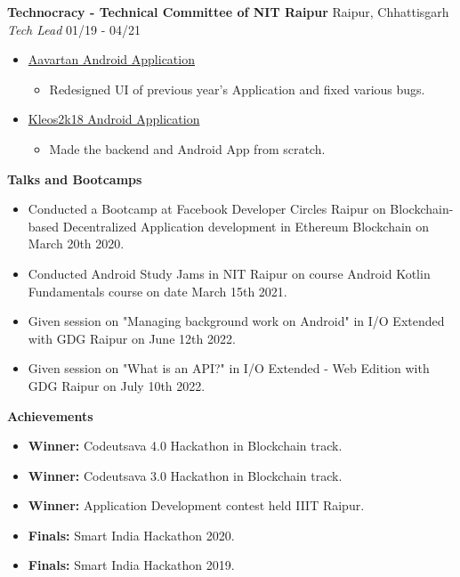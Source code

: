 \documentclass{article}
\begin{document}
\noindent \normalsize \textbf{Technocracy - Technical Committee of NIT Raipur} \hfill Raipur, Chhattisgarh \\
\noindent \normalsize \textit{Tech Lead} \hfill 01/19 - 04/21
\begin{itemize}[noitemsep,nolistsep,leftmargin=*]
    \item {\href{https://bit.ly/aavartan}{Aavartan Android Application}
        \begin{itemize}
            \item Redesigned UI of previous year’s Application and fixed various bugs.
        \end{itemize}
    }
    \item {\href{https://bit.ly/kleos2k18}{Kleos2k18 Android Application}
        \begin{itemize}
            \item Made the backend and Android App from scratch.
        \end{itemize}
    }
\end{itemize}
\noindent \large \textbf{\textcolor{NavyBlue}{Talks and Bootcamps}}
\begin{itemize}[noitemsep,nolistsep,leftmargin=*]
    \item { \normalsize Conducted a Bootcamp at Facebook Developer Circles Raipur on Blockchain-based Decentralized Application development in Ethereum Blockchain on March 20th 2020. }
    \item { \normalsize Conducted Android Study Jams in NIT Raipur on course Android Kotlin Fundamentals course on date March 15th 2021. }
    \item { \normalsize Given session on "Managing background work on Android" in I/O Extended with GDG Raipur on June 12th 2022.  }
    \item { \normalsize Given session on "What is an API?" in I/O Extended - Web Edition with GDG Raipur on July 10th 2022.  }
\end{itemize}
\vspace{10pt}
\noindent \large \textbf{\textcolor{NavyBlue}{Achievements}}
\begin{itemize}[noitemsep,nolistsep,leftmargin=*]
    \item { \normalsize \textbf{Winner:} Codeutsava 4.0 Hackathon in Blockchain track. }
    \item { \normalsize \textbf{Winner:} Codeutsava 3.0 Hackathon in Blockchain track. }
    \item { \normalsize \textbf{Winner:} Application Development contest held IIIT Raipur. }
    \item { \normalsize \textbf{Finals:} Smart India Hackathon 2020. }
    \item { \normalsize \textbf{Finals:} Smart India Hackathon 2019. }
\end{itemize}
\end{document}
